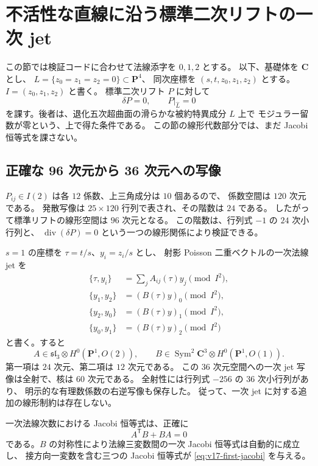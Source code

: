 \documentclass[11pt,a4paper]{ltjsarticle}
\theoremstyle{remark}\newtheorem{remark}[theorem]{注意}
\begin{document}
\section{不活性な直線に沿う標準二次リフトの一次 jet}
\label{sec:v17-line-algebra}

この節では検証コードに合わせて法線添字を $0,1,2$ とする。
以下、基礎体を $\mathbf C$ とし、
$L=\{z_0=z_1=z_2=0\}\subset\mathbf P^4$、
同次座標を $(s,t,z_0,z_1,z_2)$ とする。
$I=(z_0,z_1,z_2)$ と書く。
標準二次リフト $P$ に対して
\[
 \delta P=0,\qquad P|_{\widehat L}=0
\]
を課す。後者は、退化五次超曲面の滑らかな被約特異成分 $L$ 上で
モジュラー留数が零という、上で得た条件である。
この節の線形代数部分では、まだ Jacobi 恒等式を課さない。

\subsection{正確な 96 次元から 36 次元への写像}

$P_{ij}\in I(2)$ は各 $12$ 係数、上三角成分は $10$ 個あるので、
係数空間は $120$ 次元である。
発散写像は $25\times120$ 行列で表され、その階数は $24$ である。
したがって標準リフトの線形空間は $96$ 次元となる。
この階数は、行列式 $-1$ の $24$ 次小行列と、
$\operatorname{div}(\delta P)=0$ という一つの線形関係により検証できる。

$s=1$ の座標を $\tau=t/s$、$y_i=z_i/s$ とし、
射影 Poisson 二重ベクトルの一次法線 jet を
\begin{align*}
 \{\tau,y_i\}&=\sum_j A_{ij}(\tau)y_j\pmod{I^2},\\
 \{y_1,y_2\}&=(B(\tau)y)_0\pmod{I^2},\\
 \{y_2,y_0\}&=(B(\tau)y)_1\pmod{I^2},\\
 \{y_0,y_1\}&=(B(\tau)y)_2\pmod{I^2}
\end{align*}
と書く。すると
\[
 A\in\mathfrak{sl}_3\otimes H^0(\mathbf P^1,O(2)),\qquad
 B\in\operatorname{Sym}^2\mathbf C^3\otimes H^0(\mathbf P^1,O(1)).
\]
第一項は $24$ 次元、第二項は $12$ 次元である。
この $36$ 次元空間への一次 jet 写像は全射で、核は $60$ 次元である。
全射性には行列式 $-256$ の $36$ 次小行列があり、
明示的な有理数係数の右逆写像も保存した。
従って、一次 jet に対する追加の線形制約は存在しない。

一次法線次数における Jacobi 恒等式は、正確に
\begin{equation}
 A^{\mathsf T}B+BA=0
 \label{eq:v17-first-jacobi}
\end{equation}
である。$B$ の対称性により法線三変数間の一次 Jacobi 恒等式は自動的に成立し、
接方向一変数を含む三つの Jacobi 恒等式が
\eqref{eq:v17-first-jacobi} を与える。
\end{document}
